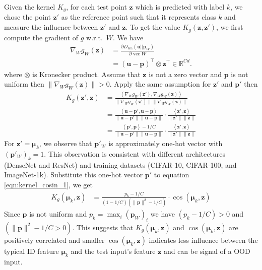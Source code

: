 \documentclass[nohyperref]{article}
\theoremstyle{plain}
\theoremstyle{definition}
\theoremstyle{remark}
\begin{document}
Given the kernel $K_g$, for each test point $\mathbf{z}$ which is predicted with label $k$, we chose the point $\mathbf{z}'$ as the reference point such that it represents class $k$ and measure the influence between $\mathbf{z}'$ and $\mathbf{z}$. 
To get the value $K_g(\mathbf{z}, \mathbf{z}')$, we first compute the gradient of $g$ w.r.t.~$W$. 
We have
\begin{align*}
    \nabla_W g_W (\mathbf{z}) 
    &= \frac{\partial D_{\text{KL}} (\mathbf{u} || \mathbf{p}_{W})}{\partial \operatorname{vec}{W}} \\
    &= (\mathbf{u} - \mathbf{p})^\top  \otimes \mathbf{z} ^\top \in \mathbb{R}^{C d}.
\end{align*}
where $\otimes$ is Kronecker product. 
Assume that $\mathbf{z}$ is not a zero vector and $\mathbf{p}$ is not uniform then $\|\nabla_W g_W (\mathbf{z}) \| > 0$. Apply the same assumption for $\mathbf{z}'$ and $\mathbf{p}'$ then 
\begin{align}
    K_g (\mathbf{z}', \mathbf{z}) &= \frac{\left< \nabla_W g_W(\mathbf{z}'),  \nabla_W g_W(\mathbf{z}) \right>}{\| \nabla_W g_W(\mathbf{z}')\| \|  \nabla_W g_W(\mathbf{z})\|} \nonumber \\
    &= \frac{\left< \mathbf{u} - \mathbf{p}', \mathbf{u} - \mathbf{p} \right>}{\| \mathbf{u} - \mathbf{p}' \|\| \mathbf{u} - \mathbf{p}\|} \cdot \frac{\left< \mathbf{z}', \mathbf{z} \right>}{\|\mathbf{z}'\|\|\mathbf{z}\|} \nonumber \\ 
    &= \frac{\left<\mathbf{p}',\mathbf{p} \right> - 1/C}{\| \mathbf{u} - \mathbf{p}' \|\| \mathbf{u} - \mathbf{p}\|} \cdot \frac{\left< \mathbf{z}', \mathbf{z} \right>}{\|\mathbf{z}'\|\|\mathbf{z}\|} \label{eqn:kernel_cosin_1} 
\end{align}
For $\mathbf{z}' = \boldsymbol{\mu}_k$, we observe that $\mathbf{p}'_W$ is approximately one-hot vector with $(\mathbf{p}'_{W})_k = 1$. This observation is consistent with different architectures (DenseNet and ResNet) and training datasets (CIFAR-10, CIFAR-100, and ImageNet-1k). Substitute this one-hot vector $\mathbf{p}'$ to equation \ref{eqn:kernel_cosin_1}, we get
\begin{align*}
    K_g (\boldsymbol{\mu}_k, \mathbf{z}) &= \frac{p_k  - 1/C}{(1 - 1/C)(\|\mathbf{p}\|^2 - 1/C)} \cdot \cos(\boldsymbol{\mu}_k, \mathbf{z})
\end{align*}
Since $\mathbf{p}$ is not uniform and $p_k = {\max}_i (\mathbf{p}_W)_i$ we have $(p_k - 1/C)> 0$ and $(\|\mathbf{p}\|^2- 1/C > 0)$.
This suggests that $K_g(\boldsymbol{\mu}_k, \mathbf{z})$ and $\cos(\boldsymbol{\mu}_k, \mathbf{z})$ are positively correlated and smaller $\cos(\boldsymbol{\mu}_k, \mathbf{z})$ indicates less influence between the typical ID feature $\boldsymbol{\mu}_k$ and the test input's feature $\mathbf{z}$ and can be signal of a OOD input. 
\end{document}
